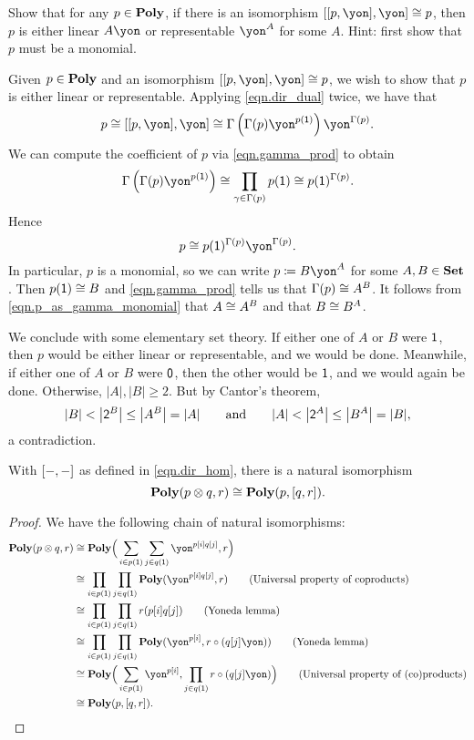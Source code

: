 \documentclass[Book-Poly]{subfiles}
\begin{document}
\begin{exercise}
Show that for any $p\in\mathbf{Poly}$, if there is an isomorphism $\ihom{\ihom{p,\yon},\yon} \iso p$, then $p$ is either linear $A\yon$ or representable $\yon^A$ for some $A$. Hint: first show that $p$ must be a monomial.
\begin{solution}
Given $p \in \mathbf{Poly}$ and an isomorphism $\ihom{\ihom{p,\yon},\yon} \iso p$, we wish to show that $p$ is either linear or representable.
Applying \eqref{eqn.dir_dual} twice, we have that
\[
    p \iso \ihom{\ihom{p,\yon},\yon} \iso \Gamma\left(\Gamma(p)\yon^{p(\1)}\right)\yon^{\Gamma(p)}.
\]
We can compute the coefficient of $p$ via \eqref{eqn.gamma_prod} to obtain
\[
    \Gamma\left(\Gamma(p)\yon^{p(\1)}\right) \iso \prod_{\gamma \in \Gamma(p)} p(\1) \iso p(\1)^{\Gamma(p)}.
\]
Hence
\begin{equation} \label{eqn.p_as_gamma_monomial}
    p \iso p(\1)^{\Gamma(p)}\yon^{\Gamma(p)}.
\end{equation}
In particular, $p$ is a monomial, so we can write $p \coloneqq B\yon^A$ for some $A,B \in \mathbf{Set}$.
Then $p(\textsf{1}) \cong B$ and \eqref{eqn.gamma_prod} tells us that $\Gamma(p) \cong A^B$.
It follows from \eqref{eqn.p_as_gamma_monomial} that $A \cong A^B$ and that $B \cong B^A$.

We conclude with some elementary set theory.
If either one of $A$ or $B$ were $\textsf{1}$, then $p$ would be either linear or representable, and we would be done.
Meanwhile, if either one of $A$ or $B$ were $\textsf{0}$, then the other would be $\textsf{1}$, and we would again be done.
Otherwise, $|A|,|B| \geq 2$.
But by Cantor's theorem,
\[
    |B| < \big|\textsf{2}^B\big| \leq \big|A^B\big| = |A| \qquad\text{and}\qquad |A| < \big|\textsf{2}^A\big| \leq \big|B^A\big| = |B|,
\]
a contradiction.
\end{solution}
\end{exercise}

\begin{proposition}\label{prop.dirichlet_closure}
With $[-,-]$ as defined in \eqref{eqn.dir_hom}, there is a natural isomorphism
\begin{equation}\label{eqn.poly_closure_brackets}
	\mathbf{Poly}(p\otimes q,r)\cong\mathbf{Poly}(p,[q,r]).
\end{equation}
\end{proposition}
\begin{proof}
We have the following chain of natural isomorphisms:
\begin{align*}
	\poly(p\otimes q,r)
	&\iso
	\poly\Big(\sum_{i\in p(\1)}\sum_{j\in q(\1)}\yon^{p[i]q[j]},r\Big) \\
	&\iso
	\prod_{i\in p(\1)}\prod_{j\in q(\1)}\poly(\yon^{p[i]q[j]},r)
	\tag{Universal property of coproducts} \\
	&\iso
	\prod_{i\in p(\1)}\prod_{j\in q(\1)}r(p[i]q[j])
	\tag{Yoneda lemma} \\
	&\iso
	\prod_{i\in p(\1)}\prod_{j\in q(\1)}\poly(\yon^{p[i]},r\circ(q[j]\yon))
	\tag{Yoneda lemma} \\
	&\iso
	\poly\Big(\sum_{i\in p(\1)}\yon^{p[i]},\prod_{j\in q(\1)}r\circ(q[j]\yon)\Big)
	\tag{Universal property of (co)products} \\
	&\iso
	\poly(p,\ihom{q,r}).
\end{align*}
\end{proof}
\end{document}

